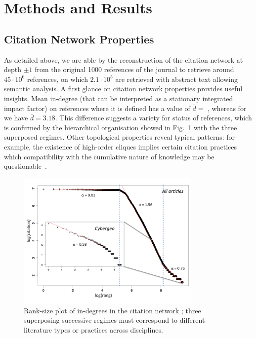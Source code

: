 \section*{Methods and Results}
\label{sec:results}



\subsection*{Citation Network Properties}


As detailed above, we are able by the reconstruction of the citation network at depth $\pm 1$ from the original 1000 references of the journal to retrieve around $45\cdot 10^6$ references, on which $2.1\cdot 10^5$ are retrieved with abstract text allowing semantic analysis. A first glance on citation network properties provides useful insights. Mean in-degree (that can be interpreted as a stationary integrated impact factor) on references where it is defined has a value of $\bar{d}=$ %
, whereas for \cite{cybergeo} we have $\bar{d}=3.18$. This difference suggests a variety for status of references, which is confirmed by the hierarchical organisation showed in Fig.~\ref{fig:ranksize} with the three superposed regimes. Other topological properties reveal typical patterns: for example, the existence of high-order cliques implies certain citation practices which compatibility with the cumulative nature of knowledge may be questionable~\cite{pumain2005cumulativite}. 




\begin{figure}[!ht]
\centering
\includegraphics[width=0.8\textwidth]{figures/ranksize.pdf}
\caption[Properties of the citation network]{Rank-size plot of in-degrees in the citation network ; three superposing successive regimes must correspond to different literature types or practices across disciplines.}
\label{fig:ranksize}
\end{figure}


